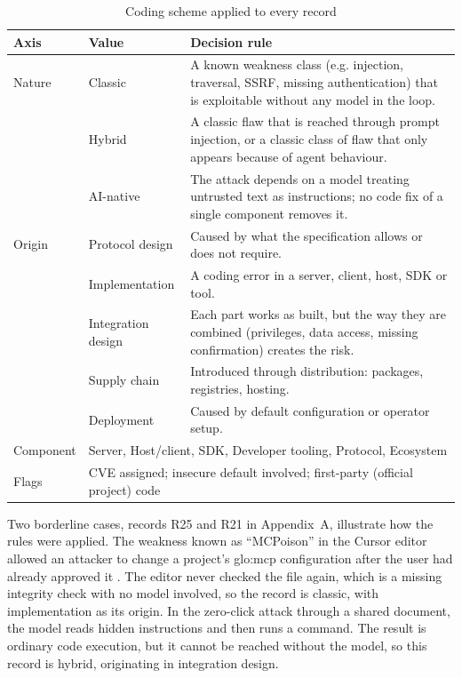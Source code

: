 \begin{table}[!htb]
\caption{Coding scheme applied to every record}
\label{tab:scheme}
\centering
\small
\renewcommand{\arraystretch}{1.0}
\begin{tabularx}{\textwidth}{@{} l l X @{}}
\toprule
\textbf{Axis} & \textbf{Value} & \textbf{Decision rule} \\
\midrule
Nature & Classic & A known weakness class (e.g. injection, traversal, SSRF, missing authentication) that is exploitable without any model in the loop. \\
 & Hybrid & A classic flaw that is reached through prompt injection, or a classic class of flaw that only appears because of agent behaviour. \\
 & AI-native & The attack depends on a model treating untrusted text as instructions; no code fix of a single component removes it. \\
\midrule
Origin & Protocol design & Caused by what the specification allows or does not require. \\
 & Implementation & A coding error in a server, client, host, SDK or tool. \\
 & Integration design & Each part works as built, but the way they are combined (privileges, data access, missing confirmation) creates the risk. \\
 & Supply chain & Introduced through distribution: packages, registries, hosting. \\
 & Deployment & Caused by default configuration or operator setup. \\
\midrule
Component & \multicolumn{2}{l}{Server, Host/client, SDK, Developer tooling, Protocol, Ecosystem} \\
Flags & \multicolumn{2}{l}{CVE assigned; insecure default involved; first-party (official project) code} \\
\bottomrule
\end{tabularx}
\end{table}

\par Two borderline cases, records R25 and R21 in Appendix~A, illustrate how the rules were applied. The weakness known as ``MCPoison'' in the Cursor editor allowed an attacker to change a project's \acrshort{glo:mcp} configuration after the user had already approved it \cite{vmp}. The editor never checked the file again, which is a missing integrity check with no model involved, so the record is classic, with implementation as its origin. In the zero-click attack through a shared document, the model reads hidden instructions and then runs a command. The result is ordinary code execution, but it cannot be reached without the model, so this record is hybrid, originating in integration design.

